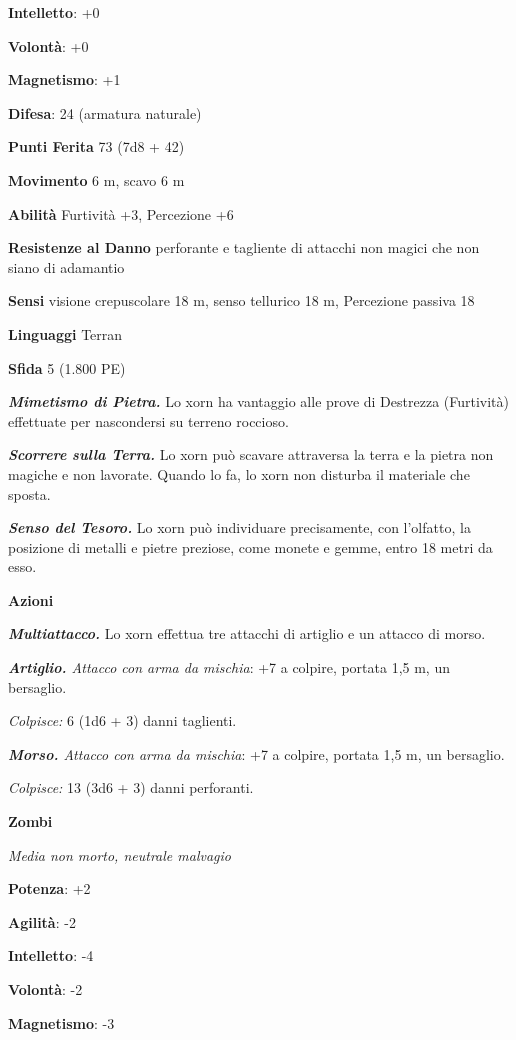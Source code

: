 \begin{multicols}{2}
\textbf{Intelletto}: +0

\textbf{Volontà}: +0

\textbf{Magnetismo}: +1

\textbf{Difesa}: 24 (armatura naturale)

\textbf{Punti Ferita} 73 (7d8 + 42)

\textbf{Movimento} 6 m, scavo 6 m

\textbf{Abilità} Furtività +3, Percezione +6

\textbf{Resistenze al Danno} perforante e tagliente di attacchi non
magici che non siano di adamantio

\textbf{Sensi} visione crepuscolare 18 m, senso tellurico 18 m, Percezione
passiva 18

\textbf{Linguaggi} Terran

\textbf{Sfida} 5 (1.800 PE)

\emph{\textbf{Mimetismo di Pietra.}} Lo xorn ha vantaggio alle prove di
Destrezza (Furtività) effettuate per nascondersi su terreno roccioso.

\emph{\textbf{Scorrere sulla Terra.}} Lo xorn può scavare attraversa la
terra e la pietra non magiche e non lavorate. Quando lo fa, lo xorn non
disturba il materiale che sposta.

\emph{\textbf{Senso del Tesoro.}} Lo xorn può individuare precisamente,
con l'olfatto, la posizione di metalli e pietre preziose, come monete e
gemme, entro 18 metri da esso.

\textbf{Azioni}

\emph{\textbf{Multiattacco.}} Lo xorn effettua tre attacchi di artiglio
e un attacco di morso.

\emph{\textbf{Artiglio.} Attacco con arma da mischia}: +7 a colpire,
portata 1,5 m, un bersaglio.

\emph{Colpisce:} 6 (1d6 + 3) danni taglienti.

\emph{\textbf{Morso.} Attacco con arma da mischia}: +7 a colpire,
portata 1,5 m, un bersaglio.

\emph{Colpisce:} 13 (3d6 + 3) danni perforanti.

\textbf{Zombi}

\emph{Media non morto, neutrale malvagio}

\textbf{Potenza}: +2

\textbf{Agilità}: -2

\textbf{Intelletto}: -4

\textbf{Volontà}: -2

\textbf{Magnetismo}: -3


\end{multicols}
